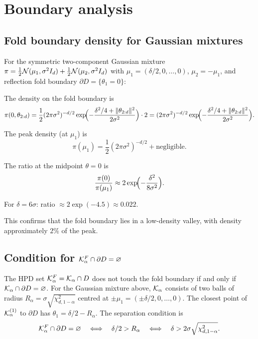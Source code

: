 \section{Boundary analysis}
\label{app:boundary}


\subsection{Fold boundary density for Gaussian mixtures}
\label{app:boundary_density}

For the symmetric two-component Gaussian mixture
$\pi = \tfrac{1}{2}\mathcal{N}(\mu_1, \sigma^2 I_d)
+ \tfrac{1}{2}\mathcal{N}(\mu_2, \sigma^2 I_d)$
with $\mu_1 = (\delta/2, 0, \ldots, 0)$,
$\mu_2 = -\mu_1$, and reflection fold boundary
$\partial D = \{\theta_1 = 0\}$:

The density on the fold boundary is
\[
  \pi(0, \theta_{2:d})
  = \frac{1}{2}(2\pi\sigma^2)^{-d/2}
  \exp\!\Bigl(-\frac{\delta^2/4 + \|\theta_{2:d}\|^2}{2\sigma^2}\Bigr)
  \cdot 2
  = (2\pi\sigma^2)^{-d/2}
  \exp\!\Bigl(-\frac{\delta^2/4 + \|\theta_{2:d}\|^2}{2\sigma^2}\Bigr).
\]

The peak density (at $\mu_1$) is
\[
  \pi(\mu_1) = \frac{1}{2}(2\pi\sigma^2)^{-d/2} + \text{negligible}.
\]

The ratio at the midpoint $\theta = 0$ is
\[
  \frac{\pi(0)}{\pi(\mu_1)}
  \approx 2\exp\!\Bigl(-\frac{\delta^2}{8\sigma^2}\Bigr).
\]

For $\delta = 6\sigma$: ratio $\approx 2\exp(-4.5) \approx 0.022$.

This confirms that the fold boundary lies in a low-density valley,
with density approximately $2\%$ of the peak.


\subsection{Condition for $\mathcal{K}_\alpha^F \cap \partial D = \varnothing$}
\label{app:boundary_separation}

The HPD set $\mathcal{K}_\alpha^F = \mathcal{K}_\alpha \cap D$ does not touch the
fold boundary if and only if $\mathcal{K}_\alpha \cap \partial D = \varnothing$.
For the Gaussian mixture above, $\mathcal{K}_\alpha$ consists of two
balls of radius $R_\alpha = \sigma\sqrt{\chi^2_{d,1-\alpha}}$
centred at $\pm\mu_1 = (\pm\delta/2, 0, \ldots, 0)$.
The closest point of $\mathcal{K}_\alpha^{(1)}$ to $\partial D$ has
$\theta_1 = \delta/2 - R_\alpha$.  The separation condition is
\[
  \mathcal{K}_\alpha^F \cap \partial D = \varnothing
  \quad\Longleftrightarrow\quad
  \delta/2 > R_\alpha
  \quad\Longleftrightarrow\quad
  \delta > 2\sigma\sqrt{\chi^2_{d,1-\alpha}}.
\]

